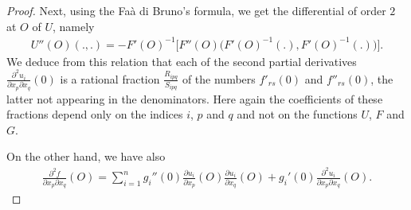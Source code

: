 \documentclass[pdftex]{sigma}%
\numberwithin{equation}{section}
\begin{document}
\begin{proof}
	Next, using the Fa\`a di Bruno's formula, we get the differential of order $2$ at $O$ of $U$, namely
\begin{gather*}
U''(O)(.,.)=-F'(O)^{-1}\big[F''(O)\big(F'(O)^{-1}(.),F'(O)^{-1}(.)\big)\big].
\end{gather*}
	We deduce from this relation that each of the second partial derivatives $\frac{\partial^2u_i}{\partial x_p\partial x_q}(0)$ is a rational fraction $\frac{R_{ipq}}{S_{ipq}}$ of the numbers $f'_{rs}(0)$ and $f''_{rs}(0)$, the latter not appearing in the denominators. Here again the coefficients of these fractions depend only on the indices $i$, $p$ and $q$ and not on the functions $U$, $F$ and $G$.
	
	On the other hand, we have also
\begin{gather*}
\frac{\partial^2 f}{\partial x_p\partial x_q}(O)=\sum_{i=1}^{n}g_i''(0)\frac{\partial u_i}{\partial x_p}(O)\frac{\partial u_i}{\partial x_q}(O)+g_i'(0)\frac{\partial^2 u_i}{\partial x_p\partial x_q}(O).
\end{gather*}
	

\end{proof}
\end{document}
